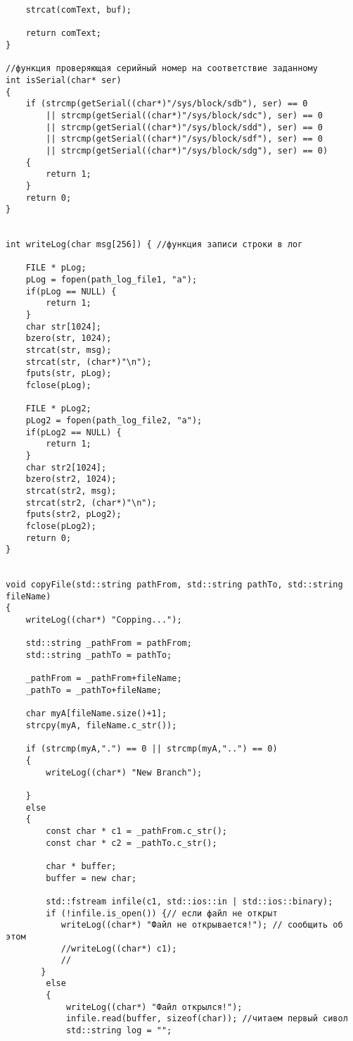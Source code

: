 \documentclass[12pt,a4paper]{scrartcl}
\begin{document}
\begin{verbatim}
    strcat(comText, buf);

    return comText;
}

//функция проверяющая серийный номер на соответствие заданному
int isSerial(char* ser)
{
    if (strcmp(getSerial((char*)"/sys/block/sdb"), ser) == 0
        || strcmp(getSerial((char*)"/sys/block/sdc"), ser) == 0
        || strcmp(getSerial((char*)"/sys/block/sdd"), ser) == 0
        || strcmp(getSerial((char*)"/sys/block/sdf"), ser) == 0
        || strcmp(getSerial((char*)"/sys/block/sdg"), ser) == 0)
    {
        return 1;
    }
    return 0;
}


int writeLog(char msg[256]) { //функция записи строки в лог

    FILE * pLog;
    pLog = fopen(path_log_file1, "a");
    if(pLog == NULL) {
        return 1;
    }
    char str[1024];
    bzero(str, 1024);
    strcat(str, msg);
    strcat(str, (char*)"\n");
    fputs(str, pLog);
    fclose(pLog);

	FILE * pLog2;
    pLog2 = fopen(path_log_file2, "a");
    if(pLog2 == NULL) {
        return 1;
    }
    char str2[1024];
    bzero(str2, 1024);
    strcat(str2, msg);
    strcat(str2, (char*)"\n");
    fputs(str2, pLog2);
    fclose(pLog2);
    return 0;
}


void copyFile(std::string pathFrom, std::string pathTo, std::string fileName)
{
    writeLog((char*) "Copping...");

    std::string _pathFrom = pathFrom;
    std::string _pathTo = pathTo;

    _pathFrom = _pathFrom+fileName;
    _pathTo = _pathTo+fileName;

    char myA[fileName.size()+1];
    strcpy(myA, fileName.c_str());

    if (strcmp(myA,".") == 0 || strcmp(myA,"..") == 0)
    {
        writeLog((char*) "New Branch");
        
    }
    else
    {
        const char * c1 = _pathFrom.c_str(); 
        const char * c2 = _pathTo.c_str(); 

        char * buffer;
        buffer = new char;
    
        std::fstream infile(c1, std::ios::in | std::ios::binary);
        if (!infile.is_open()) {// если файл не открыт
           writeLog((char*) "Файл не открывается!"); // сообщить об этом
           //writeLog((char*) c1);
           //
       }
        else 
        {
            writeLog((char*) "Файл открылся!");
            infile.read(buffer, sizeof(char)); //читаем первый сивол
            std::string log = "";


\end{verbatim}
\end{document}
